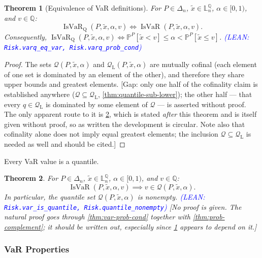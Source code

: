 \documentclass[letterpaper]{article}
\theoremstyle{plain}
\newtheorem{theorem}{Theorem}[subsection]
\theoremstyle{definition}
\theoremstyle{remark}
\newcommand{\PP}{\mathbb{P}}
\DeclareMathOperator{\isvar}{IsVaR}
\newcommand{\cc}[1]{\textcolor{ccolor}{[#1]}}
\newcommand{\lean}[1]{\textcolor{blue}{(\emph{LEAN}: \texttt{#1})}}
\newcommand{\leanok}{}
\begin{document}
\begin{theorem}[Equivalence of VaR definitions] \label{thm:varq-eq-var}
For $P\in \Delta_n$, $\tilde{x}\in \mathbb{L}_n^{\mathbb{Q}}$, $\alpha\in [0,1)$, and $v\in \mathbb{Q}$:
  \[
    \isvar_{\mathrm{Q}}(P,\tilde{x},\alpha, v)
    \Longleftrightarrow
    \isvar(P,\tilde{x},\alpha, v).
  \]
  Consequently, $\isvar_{\mathrm{Q}}(P,\tilde{x},\alpha, v) \Leftrightarrow \PP^P[\tilde{x} < v] \le \alpha < \PP^P[\tilde{x} \le v]$.
  \lean{Risk.varq\_eq\_var, Risk.varq\_prob\_cond} \leanok
\end{theorem}
\begin{proof}
The sets $\mathcal{Q}(P,\tilde{x},\alpha)$ and $\mathcal{Q}_{\mathrm{L}}(P,\tilde{x},\alpha)$ are mutually cofinal (each element of one set is dominated by an element of the other), and therefore they share upper bounds and greatest elements.
\cc{Gap: only one half of the cofinality claim is established anywhere ($\mathcal{Q}\subseteq \mathcal{Q}_{\mathrm{L}}$, \cref{thm:quantile-sub-lower}); the other half --- that every $q\in \mathcal{Q}_{\mathrm{L}}$ is dominated by some element of $\mathcal{Q}$ --- is asserted without proof. The only apparent route to it is \cref{thm:var-is-quantile}, which is stated \emph{after} this theorem and is itself given without proof, so as written the development is circular. Note also that cofinality alone does not imply equal greatest elements; the inclusion $\mathcal{Q}\subseteq\mathcal{Q}_{\mathrm{L}}$ is needed as well and should be cited.}
\end{proof}

Every VaR value is a quantile.
\begin{theorem} \label{thm:var-is-quantile}
For $P\in \Delta_n$, $\tilde{x}\in \mathbb{L}_n^{\mathbb{Q}}$, $\alpha\in [0,1)$, and $v\in \mathbb{Q}$:
  \[
    \isvar(P,\tilde{x},\alpha, v)
    \implies
    v \in \mathcal{Q}(P, \tilde{x}, \alpha).
  \]
  In particular, the quantile set $\mathcal{Q}(P, \tilde{x}, \alpha)$ is nonempty.
  \lean{Risk.var\_is\_quantile, Risk.quantile\_nonempty} \leanok
  \cc{No proof is given. The natural proof goes through \cref{thm:var-prob-cond} together with \cref{thm:prob-complement}; it should be written out, especially since \cref{thm:varq-eq-var} appears to depend on it.}
\end{theorem}

\subsubsection{VaR Properties}
\end{document}
